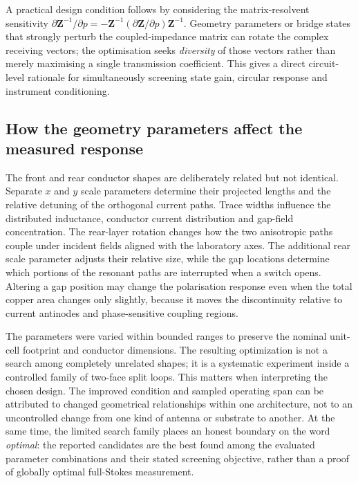 \documentclass{ieeeaccess}
\begin{document}
A practical design condition follows by considering the matrix-resolvent sensitivity $\partial \mathbf{Z}^{-1}/\partial p=-\mathbf{Z}^{-1}(\partial \mathbf Z/\partial p)\mathbf{Z}^{-1}$. Geometry parameters or bridge states that strongly perturb the coupled-impedance matrix can rotate the complex receiving vectors; the optimisation seeks \emph{diversity} of those vectors rather than merely maximising a single transmission coefficient. This gives a direct circuit-level rationale for simultaneously screening state gain, circular response and instrument conditioning.

\subsection{How the geometry parameters affect the measured response}
The front and rear conductor shapes are deliberately related but not identical. Separate $x$ and $y$ scale parameters determine their projected lengths and the relative detuning of the orthogonal current paths. Trace widths influence the distributed inductance, conductor current distribution and gap-field concentration. The rear-layer rotation changes how the two anisotropic paths couple under incident fields aligned with the laboratory axes. The additional rear scale parameter adjusts their relative size, while the gap locations determine which portions of the resonant paths are interrupted when a switch opens. Altering a gap position may change the polarisation response even when the total copper area changes only slightly, because it moves the discontinuity relative to current antinodes and phase-sensitive coupling regions.

The parameters were varied within bounded ranges to preserve the nominal unit-cell footprint and conductor dimensions. The resulting optimization is not a search among completely unrelated shapes; it is a systematic experiment inside a controlled family of two-face split loops. This matters when interpreting the chosen design. The improved condition and sampled operating span can be attributed to changed geometrical relationships within one architecture, not to an uncontrolled change from one kind of antenna or substrate to another. At the same time, the limited search family places an honest boundary on the word \emph{optimal}: the reported candidates are the best found among the evaluated parameter combinations and their stated screening objective, rather than a proof of globally optimal full-Stokes measurement.
\end{document}
